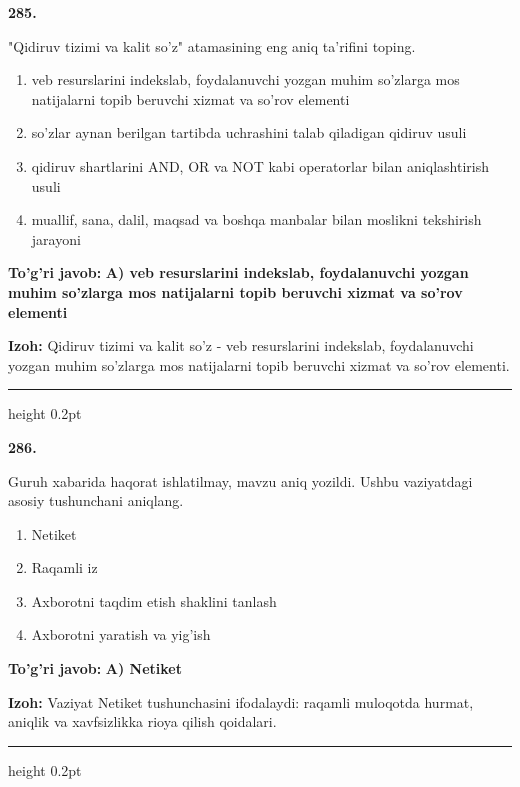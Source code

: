 \documentclass[10pt,a4paper,oneside]{article}
\begin{document}
\noindent\textbf{\color{ink}285.}
\par
"Qidiruv tizimi va kalit so'z" atamasining eng aniq ta'rifini toping.
\begin{enumerate}[label=\Alph*),leftmargin=9mm]
\item veb resurslarini indekslab, foydalanuvchi yozgan muhim so'zlarga mos natijalarni topib beruvchi xizmat va so'rov elementi
\item so'zlar aynan berilgan tartibda uchrashini talab qiladigan qidiruv usuli
\item qidiruv shartlarini AND, OR va NOT kabi operatorlar bilan aniqlashtirish usuli
\item muallif, sana, dalil, maqsad va boshqa manbalar bilan moslikni tekshirish jarayoni
\end{enumerate}
\begin{tcolorbox}[enhanced,breakable,colback=teal!4,colframe=teal!50!black,boxrule=0.5pt,arc=1.1mm,left=3mm,right=3mm,top=1.7mm,bottom=1.7mm,before skip=2mm,after skip=2mm]
\textbf{\color{teal}To'g'ri javob:} \textbf{A) veb resurslarini indekslab, foydalanuvchi yozgan muhim so'zlarga mos natijalarni topib beruvchi xizmat va so'rov elementi}
\par\smallskip
\textbf{Izoh:} Qidiruv tizimi va kalit so'z - veb resurslarini indekslab, foydalanuvchi yozgan muhim so'zlarga mos natijalarni topib beruvchi xizmat va so'rov elementi.
\end{tcolorbox}
\vspace{2mm}\hrule height 0.2pt \vspace{3mm}

\noindent\textbf{\color{ink}286.}
\par
Guruh xabarida haqorat ishlatilmay, mavzu aniq yozildi. Ushbu vaziyatdagi asosiy tushunchani aniqlang.
\begin{enumerate}[label=\Alph*),leftmargin=9mm]
\item Netiket
\item Raqamli iz
\item Axborotni taqdim etish shaklini tanlash
\item Axborotni yaratish va yig'ish
\end{enumerate}
\begin{tcolorbox}[enhanced,breakable,colback=teal!4,colframe=teal!50!black,boxrule=0.5pt,arc=1.1mm,left=3mm,right=3mm,top=1.7mm,bottom=1.7mm,before skip=2mm,after skip=2mm]
\textbf{\color{teal}To'g'ri javob:} \textbf{A) Netiket}
\par\smallskip
\textbf{Izoh:} Vaziyat Netiket tushunchasini ifodalaydi: raqamli muloqotda hurmat, aniqlik va xavfsizlikka rioya qilish qoidalari.
\end{tcolorbox}
\vspace{2mm}\hrule height 0.2pt \vspace{3mm}
\end{document}

